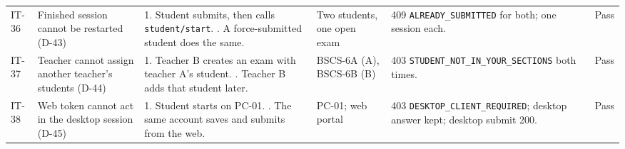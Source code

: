 {\begin{longtable}{@{}P{1.1cm}P{2.5cm}P{3.5cm}P{2.6cm}P{2.9cm}>{\centering\arraybackslash}p{1.8cm}@{}}
IT-36 & Finished session cannot be restarted (D-43) & 1. Student submits, then calls \texttt{student/\allowbreak{}start}. . A force-submitted student does the same. & Two students, one open exam  & 409 \texttt{ALREADY\_\allowbreak{}SUBMITTED} for both; one session each. & Pass\\
IT-37 & Teacher cannot assign another teacher's students (D-44) & 1. Teacher B creates an exam with teacher A's student. . Teacher B adds that student later. & BSCS-6A (A), BSCS-6B (B)  & 403 \texttt{STUDENT\_\allowbreak{}NOT\_\allowbreak{}IN\_\allowbreak{}YOUR\_\allowbreak{}SECTIONS} both times. & Pass\\
IT-38 & Web token cannot act in the desktop session (D-45) & 1. Student starts on PC-01. . The same account saves and submits from the web. & PC-01; web portal  & 403 \texttt{DESKTOP\_\allowbreak{}CLIENT\_\allowbreak{}REQUIRED}; desktop answer kept; desktop submit 200. & Pass\\
\end{longtable}}

